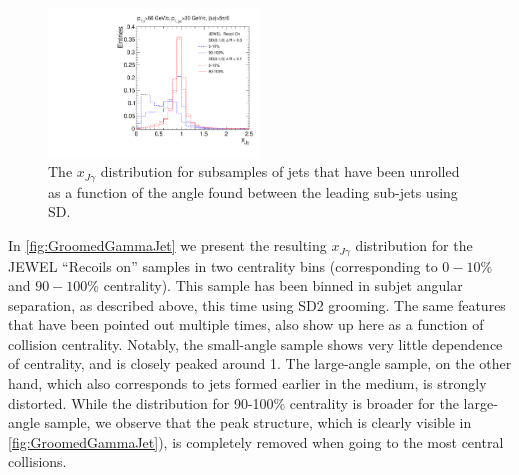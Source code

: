 \begin{figure}[th]
\centering
\includegraphics[width=0.5\textwidth]
{figures/Observables_GammaJet/JEWEL-photon-jet-recoilOn-linear}%
\caption{The $x_{J\gamma}$ distribution for subsamples of jets that have been unrolled as a function of the angle found between the leading sub-jets using SD. }
\label{fig:GroomedGammaJet}
\end{figure}
In \autoref{fig:GroomedGammaJet} we present the resulting $x_{J\gamma}$ distribution for the JEWEL ``Recoils on'' samples in two centrality bins (corresponding to $0-10$\% and $90-100$\% centrality). This sample has been binned in subjet angular separation, as described above, this time using SD2 grooming. The same features that have been pointed out multiple times, also show up here as a function of collision centrality. Notably, the small-angle sample shows very little dependence of centrality, and is closely peaked around 1. The large-angle sample, on the other hand, which also corresponds to jets formed earlier in the medium, is strongly distorted. While the distribution for  90-100\% centrality is broader for the large-angle sample, we observe that the peak structure, which is clearly visible in \autoref{fig:GroomedGammaJet}), is completely removed when going to the most central collisions. 

